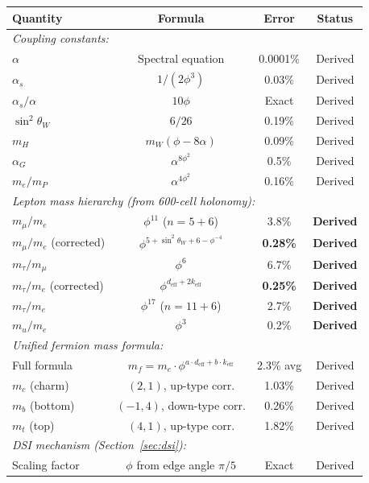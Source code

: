 \documentclass[12pt,a4paper]{article}
\begin{document}
\begin{table}[H]
\centering
\begin{tabular}{lccc}
\toprule
\textbf{Quantity} & \textbf{Formula} & \textbf{Error} & \textbf{Status} \\
\midrule
\multicolumn{4}{l}{\textit{Coupling constants:}} \\
$\alpha$ & Spectral equation & 0.0001\% & Derived \\
$\alpha_s$ & $1/(2\phi^3)$ & 0.03\% & Derived \\
$\alpha_s/\alpha$ & $10\phi$ & Exact & Derived \\
$\sin^2\theta_W$ & $6/26$ & 0.19\% & Derived \\
$m_H$ & $m_W(\phi - 8\alpha)$ & 0.09\% & Derived \\
$\alpha_G$ & $\alpha^{8\phi^2}$ & 0.5\% & Derived \\
$m_e/m_P$ & $\alpha^{4\phi^2}$ & 0.16\% & Derived \\
\midrule
\multicolumn{4}{l}{\textit{Lepton mass hierarchy (from 600-cell holonomy):}} \\
$m_\mu/m_e$ & $\phi^{11}$ ($n=5+6$) & 3.8\% & \textbf{Derived} \\
$m_\mu/m_e$ (corrected) & $\phi^{5+\sin^2\theta_W+6-\phi^{-4}}$ & \textbf{0.28\%} & \textbf{Derived} \\
$m_\tau/m_\mu$ & $\phi^{6}$ & 6.7\% & \textbf{Derived} \\
$m_\tau/m_e$ (corrected) & $\phi^{d_{\text{eff}}+2k_{\text{eff}}}$ & \textbf{0.25\%} & \textbf{Derived} \\
$m_\tau/m_e$ & $\phi^{17}$ ($n=11+6$) & 2.7\% & \textbf{Derived} \\
$m_u/m_e$ & $\phi^{3}$ & 0.2\% & \textbf{Derived} \\
\midrule
\multicolumn{4}{l}{\textit{Unified fermion mass formula:}} \\
Full formula & $m_f = m_e \cdot \phi^{a \cdot d_{\text{eff}} + b \cdot k_{\text{eff}}}$ & 2.3\% avg & Derived \\
$m_c$ (charm) & $(2,1)$, up-type corr. & 1.03\% & Derived \\
$m_b$ (bottom) & $(-1,4)$, down-type corr. & 0.26\% & Derived \\
$m_t$ (top) & $(4,1)$, up-type corr. & 1.82\% & Derived \\
\midrule
\multicolumn{4}{l}{\textit{DSI mechanism (Section~\ref{sec:dsi}):}} \\
Scaling factor & $\phi$ from edge angle $\pi/5$ & Exact & Derived \\

\end{tabular}
\end{table}
\end{document}
